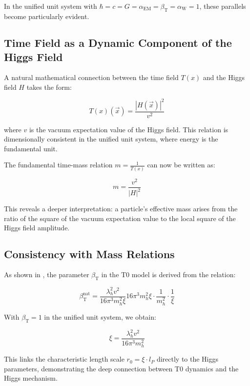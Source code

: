 \documentclass[12pt,a4paper]{article}
\newcommand{\Tfield}{T(x)}
\newcommand{\betaT}{\beta_{\text{T}}}
\newcommand{\alphaEM}{\alpha_{\text{EM}}}
\newcommand{\alphaW}{\alpha_{\text{W}}}
\newcommand{\vecx}{\vec{x}}
\begin{document}
	In the unified unit system with \(\hbar = c = G = \alphaEM = \betaT = \alphaW = 1\), these parallels become particularly evident.
	
	\subsection{Time Field as a Dynamic Component of the Higgs Field}
	A natural mathematical connection between the time field \(\Tfield\) and the Higgs field \(H\) takes the form:
	
	\begin{equation}
		\Tfield(\vecx) = \frac{|H(\vecx)|^2}{v^2}
	\end{equation}
	
	where \(v\) is the vacuum expectation value of the Higgs field. This relation is dimensionally consistent in the unified unit system, where energy is the fundamental unit.
	
	The fundamental time-mass relation \(m = \frac{1}{\Tfield}\) can now be written as:
	
	\begin{equation}
		m = \frac{v^2}{|H|^2}
	\end{equation}
	
	This reveals a deeper interpretation: a particle's effective mass arises from the ratio of the square of the vacuum expectation value to the local square of the Higgs field amplitude.
	
	\subsection{Consistency with Mass Relations}
	As shown in \cite{pascher_params_2025}, the parameter \(\betaT\) in the T0 model is derived from the relation:
	
	\begin{equation}
		\betaT^{\text{nat}} = \frac{\lambda_h^2 v^2}{16\pi^3 m_h^2 \xi}{16\pi^3 m_h^2 \xi} \cdot \frac{1}{m_h^2} \cdot \frac{1}{\xi}
	\end{equation}
	
	With \(\betaT = 1\) in the unified unit system, we obtain:
	
	\begin{equation}
		\xi = \frac{\lambda_h^2 v^2}{16\pi^3 m_h^2}
	\end{equation}
	
	This links the characteristic length scale \(r_0 = \xi \cdot l_P\) directly to the Higgs parameters, demonstrating the deep connection between T0 dynamics and the Higgs mechanism.
	
\end{document}
